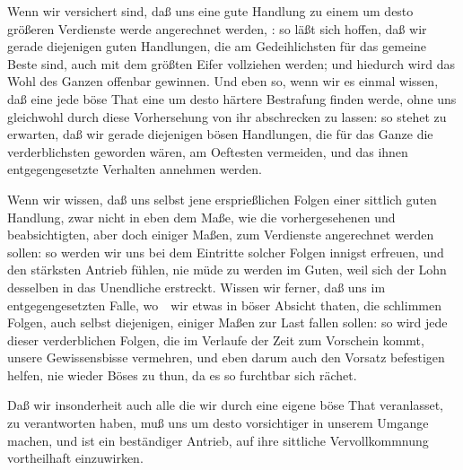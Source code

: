 \begin{aufza}
\begin{aufzb}
\end{aufzb}
\item Wenn wir versichert sind, daß uns eine gute Handlung zu einem um desto größeren Verdienste werde angerechnet werden, : so läßt sich hoffen, daß wir gerade diejenigen guten Handlungen, die am Gedeihlichsten für das gemeine Beste sind, auch mit dem größten Eifer vollziehen werden; und hiedurch wird das Wohl des Ganzen offenbar gewinnen. Und eben so, wenn wir es einmal wissen, daß eine jede böse That eine um desto härtere Bestrafung finden werde,  ohne uns gleichwohl durch diese Vorhersehung von ihr abschrecken zu lassen: so stehet zu erwarten, daß wir gerade diejenigen bösen Handlungen, die für das Ganze die verderblichsten geworden wären, am Oeftesten vermeiden, und das ihnen entgegengesetzte Verhalten annehmen werden.
\item Wenn wir wissen, daß uns selbst jene ersprießlichen Folgen einer sittlich guten Handlung,  zwar nicht in eben dem Maße, wie die vorhergesehenen und beabsichtigten, aber doch einiger Maßen, zum Verdienste angerechnet werden sollen: so werden wir uns bei dem Eintritte solcher Folgen innigst erfreuen, und den stärksten Antrieb fühlen, nie müde zu werden im Guten, weil sich der Lohn desselben in das Unendliche erstreckt. Wissen wir ferner, daß uns im entgegengesetzten Falle, wo~\ wir etwas in böser Absicht thaten, die schlimmen Folgen, auch selbst diejenigen,  einiger Maßen zur Last fallen sollen: so wird jede dieser verderblichen Folgen, die im Verlaufe der Zeit zum Vorschein kommt, unsere Gewissensbisse vermehren, und eben darum auch den Vorsatz befestigen helfen, nie wieder Böses zu thun, da es so furchtbar sich rächet.
\item Daß wir insonderheit auch alle  die wir durch eine eigene böse That veranlasset, zu verantworten haben, muß uns um desto vorsichtiger in unserem Umgange machen, und ist ein beständiger Antrieb, auf ihre sittliche Vervollkommnung vortheilhaft einzuwirken.

\end{aufza}
